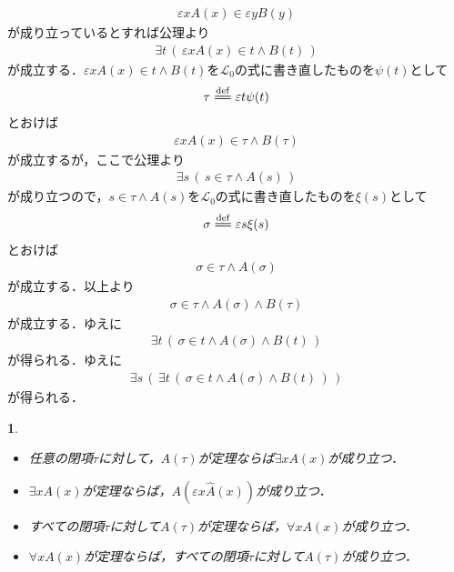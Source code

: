 \documentclass[a4j,10.5pt,oneside,openany]{jsbook}
\theoremstyle{mystyle}
\newtheorem{logicalaxm}[thm]{\color{Mahogany}{推論規則}}
\newcommand{\defeq}{\overset{\mathrm{def}}{=\joinrel=}} %
\begin{document}
\begin{itemize}
\begin{align}
				\varepsilon x A(x) \in \varepsilon y B(y)
			\end{align}
			が成り立っているとすれば公理より
			\begin{align}
				\exists t\, \left(\, \varepsilon x A(x) \in t \wedge B(t)\, \right)
			\end{align}
			が成立する．$\varepsilon x A(x) \in t \wedge B(t)$を$\mathcal{L}_{0}$の式に書き直したものを$\psi(t)$として
			\begin{align}
				\tau \defeq \varepsilon t \psi(t)
			\end{align}
			とおけば
			\begin{align}
				\varepsilon x A(x) \in \tau \wedge B(\tau)
			\end{align}
			が成立するが，ここで公理より
			\begin{align}
				\exists s\, \left(\, s \in \tau \wedge A(s)\, \right)
			\end{align}
			が成り立つので，$s \in \tau \wedge A(s)$を$\mathcal{L}_{0}$の式に書き直したものを$\xi(s)$として
			\begin{align}
				\sigma \defeq \varepsilon s \xi(s)
			\end{align}
			とおけば
			\begin{align}
				\sigma \in \tau \wedge A(\sigma)
			\end{align}
			が成立する．以上より
			\begin{align}
				\sigma \in \tau \wedge A(\sigma) \wedge B(\tau)
			\end{align}
			が成立する．ゆえに
			\begin{align}
				\exists t\, \left(\, \sigma \in t \wedge A(\sigma) \wedge B(t)\, \right)
			\end{align}
			が得られる．ゆえに
			\begin{align}
				\exists s\, \left(\, \exists t\, \left(\, \sigma \in t \wedge A(\sigma) \wedge B(t)\, \right)\, \right)
			\end{align}
			が得られる．
	\end{itemize}
	
	\begin{screen}
		\begin{logicalaxm}\mbox{}
			\begin{itemize}
				\item 任意の閉項$\tau$に対して，$A(\tau)$が定理ならば$\exists x A(x)$が成り立つ．
				\item $\exists x A(x)$が定理ならば，$A(\varepsilon x \hat{A}(x))$が成り立つ．
				\item すべての閉項$\tau$に対して$A(\tau)$が定理ならば，$\forall x A(x)$が成り立つ．
				\item $\forall x A(x)$が定理ならば，すべての閉項$\tau$に対して$A(\tau)$が成り立つ．
			\end{itemize}
		\end{logicalaxm}
	\end{screen}
	
\end{document}

